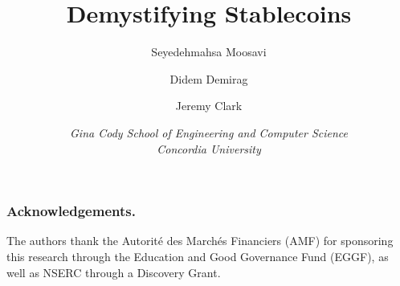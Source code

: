 \documentclass[letterpaper]{article}
\begin{document}
\title{Demystifying Stablecoins}
\author{}\date{}

\author{Seyedehmahsa Moosavi \and Didem Demirag \and Jeremy Clark}
\date{\textit{Gina Cody School of Engineering and Computer Science\\Concordia University}}
\maketitle


\begin{abstract}

\end{abstract}





\subsubsection*{Acknowledgements.}
The authors thank the Autorit\'e des March\'es Financiers (AMF) for sponsoring this research through the Education and Good Governance Fund (EGGF), as well as NSERC through a Discovery Grant. 




%

\end{document}
